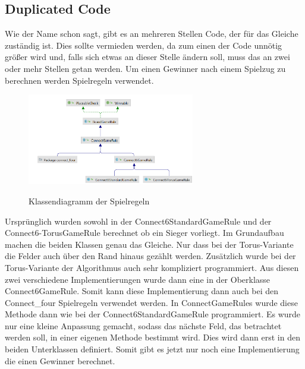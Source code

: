 \documentclass[12pt]{article}
\begin{document}
\subsection{Duplicated Code}
Wie der Name schon sagt, gibt es an mehreren Stellen Code, der für das Gleiche zuständig ist. Dies sollte vermieden werden, da zum einen der Code unnötig größer wird und, falls sich etwas an dieser Stelle ändern soll, muss das an zwei oder mehr Stellen getan werden. Um einen Gewinner nach einem Spielzug zu berechnen werden Spielregeln verwendet.

\begin{figure}[H]
\centering
{\includegraphics[height=4cm]{Bilder/ClassDiagGameRules}}
\caption{Klassendiagramm der Spielregeln}
\label{fig:ClassDiagGameRules}
\end{figure}

Ursprünglich wurden sowohl in der Connect6StandardGameRule und der Connect6-TorusGameRule berechnet ob ein Sieger vorliegt. Im Grundaufbau machen die beiden Klassen genau das Gleiche. Nur dass bei der Torus-Variante die Felder auch über den Rand hinaus gezählt werden. Zusätzlich wurde bei der Torus-Variante der Algorithmus auch sehr kompliziert programmiert. Aus diesen zwei verschiedene Implementierungen wurde dann eine in der Oberklasse Connect6GameRule. Somit kann diese Implementierung dann auch bei den Connect\_four Spielregeln verwendet werden. In ConnectGameRules wurde diese Methode dann wie bei der Connect6StandardGameRule programmiert. Es wurde nur eine kleine Anpassung gemacht, sodass das nächste Feld, das betrachtet werden soll, in einer eigenen Methode bestimmt wird. Dies wird dann erst in den beiden Unterklassen definiert. Somit gibt es jetzt nur noch eine Implementierung die einen Gewinner berechnet.
\end{document}
